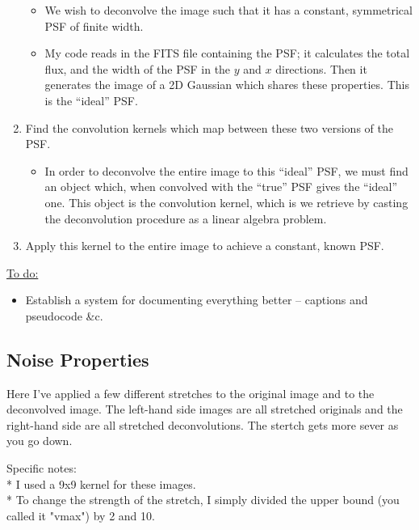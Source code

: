 \documentclass[letterpaper, 11pt]{article}
\begin{document}
\begin{enumerate}
		\begin{itemize}
			\item We wish to deconvolve the image such that it has a constant, symmetrical PSF of finite width.
			\item My code reads in the FITS file containing the PSF; it calculates the total flux, and the width of the PSF in the $y$ and $x$ directions. Then it generates the image of a 2D Gaussian which shares these properties. This is the ``ideal'' PSF.
		\end{itemize}
	\item Find the convolution kernels which map between these two versions of the PSF.
		\begin{itemize}
			\item In order to deconvolve the entire image to this ``ideal'' PSF, we must find an object which, when convolved with the ``true'' PSF gives the ``ideal'' one. This object is the convolution kernel, which is we retrieve by casting the deconvolution procedure as a linear algebra problem.
		\end{itemize}
	\item Apply this kernel to the entire image to achieve a constant, known PSF.
\end{enumerate}

\underline{To do:}
\begin{itemize}
	\item Establish a system for documenting everything better -- captions and pseudocode \&c.
\end{itemize}


\subsection*{Noise Properties}


Here I've applied a few different stretches to the original image and to the deconvolved image. The left-hand side images are all stretched originals and the right-hand side are all stretched deconvolutions. The stertch gets more sever as you go down.


Specific notes:\\
* I used a 9x9 kernel for these images.\\
* To change the strength of the stretch, I simply divided the upper bound (you called it "vmax") by 2 and 10.\\


\end{document}
